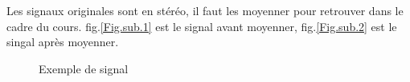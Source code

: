 
Les signaux originales sont en stéréo, il faut les moyenner pour retrouver dans le cadre du cours.
fig.\ref{Fig.sub.1} est le signal avant moyenner, fig.\ref{Fig.sub.2} est le singal après moyenner.
\begin{figure}[htb]
\caption{Exemple de signal}
\label{Fig.main}
\end{figure}
